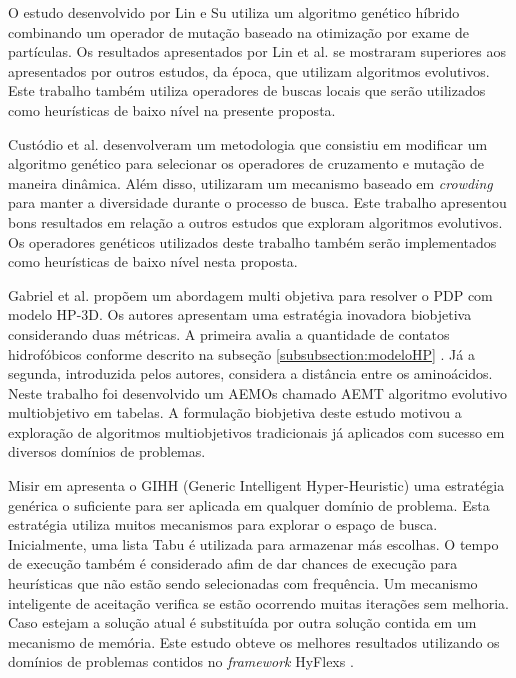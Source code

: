 O estudo \cite{lin2011protein} desenvolvido por Lin e Su utiliza um algoritmo genético híbrido combinando um operador de mutação baseado na otimização por exame de partículas. Os resultados apresentados por Lin et al. se mostraram superiores aos apresentados por outros estudos, da época, que utilizam algoritmos evolutivos. Este trabalho também utiliza operadores de buscas locais que serão utilizados como heurísticas de baixo nível na presente proposta. 


Custódio et al. \cite{custodio2014multiple} desenvolveram um metodologia que consistiu em modificar um algoritmo genético para selecionar os operadores de cruzamento e mutação de maneira dinâmica. Além disso, utilizaram um mecanismo baseado em \textit{crowding}  para manter a diversidade durante o processo de busca. Este trabalho apresentou bons resultados em relação a outros estudos que exploram algoritmos evolutivos. Os operadores genéticos utilizados deste trabalho também serão implementados como heurísticas de baixo nível nesta proposta.

Gabriel et al. propõem um abordagem multi objetiva \cite{gabriel2012algoritmos} para resolver o PDP com modelo HP-3D. Os autores apresentam uma estratégia inovadora biobjetiva considerando duas métricas. A primeira avalia a quantidade de contatos hidrofóbicos conforme descrito na subseção \ref{subsubsection:modeloHP}  . Já a segunda, introduzida pelos autores, considera a distância entre os aminoácidos. Neste trabalho foi desenvolvido um AEMOs chamado AEMT \cite{gabriel2012algoritmos} algoritmo evolutivo multiobjetivo em tabelas. A formulação biobjetiva deste estudo motivou a exploração de algoritmos multiobjetivos tradicionais já aplicados com sucesso em diversos domínios de problemas.  


Misir em \cite{misir2012intelligent} apresenta o GIHH (Generic Intelligent Hyper-Heuristic) uma estratégia genérica o suficiente para ser aplicada em qualquer domínio de problema. Esta estratégia utiliza muitos mecanismos para explorar o espaço de busca. Inicialmente, uma lista Tabu é utilizada para armazenar más escolhas. O tempo de execução também é considerado afim de dar chances de execução para heurísticas que não estão sendo selecionadas com frequência. Um mecanismo inteligente de aceitação verifica se estão ocorrendo muitas iterações sem melhoria. Caso estejam a solução atual é substituída por outra solução contida em um mecanismo de memória. Este estudo obteve os melhores resultados utilizando os domínios de problemas contidos no \textit{framework} HyFlexs \cite{ochoa2012hyflex}.

